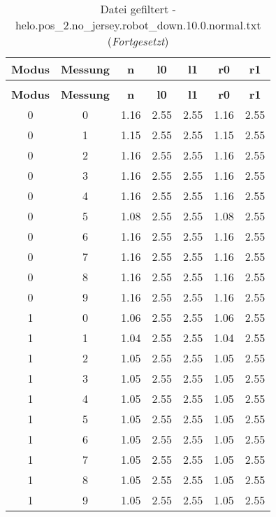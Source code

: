 \clearpage{}
\begin{longtable}{|c|c||c||c|c||c|c|}
	\caption{Datei gefiltert - helo.pos\_2.no\_jersey.robot\_down.10.0.normal.txt} \label{tab:helo.pos-2.no-jersey.robot-down.10.0.normal.txt} \\ \hline
	\textbf{Modus} & \textbf{Messung} & \textbf{n} & \textbf{l0} & \textbf{l1} & \textbf{r0} & \textbf{r1}\\ \hline
	\endfirsthead
	\caption[]{Datei gefiltert - helo.pos\_2.no\_jersey.robot\_down.10.0.normal.txt (\emph{Fortgesetzt})} \\ \hline
	\textbf{Modus} & \textbf{Messung} & \textbf{n} & \textbf{l0} & \textbf{l1} & \textbf{r0} & \textbf{r1}\\ \hline
	\endhead
	0 & 0 & 1.16 & 2.55 & 2.55 & 1.16 & 2.55 \\ \hline
	0 & 1 & 1.15 & 2.55 & 2.55 & 1.15 & 2.55 \\ \hline
	0 & 2 & 1.16 & 2.55 & 2.55 & 1.16 & 2.55 \\ \hline
	0 & 3 & 1.16 & 2.55 & 2.55 & 1.16 & 2.55 \\ \hline
	0 & 4 & 1.16 & 2.55 & 2.55 & 1.16 & 2.55 \\ \hline
	0 & 5 & 1.08 & 2.55 & 2.55 & 1.08 & 2.55 \\ \hline
	0 & 6 & 1.16 & 2.55 & 2.55 & 1.16 & 2.55 \\ \hline
	0 & 7 & 1.16 & 2.55 & 2.55 & 1.16 & 2.55 \\ \hline
	0 & 8 & 1.16 & 2.55 & 2.55 & 1.16 & 2.55 \\ \hline
	0 & 9 & 1.16 & 2.55 & 2.55 & 1.16 & 2.55 \\ \hline
	1 & 0 & 1.06 & 2.55 & 2.55 & 1.06 & 2.55 \\ \hline
	1 & 1 & 1.04 & 2.55 & 2.55 & 1.04 & 2.55 \\ \hline
	1 & 2 & 1.05 & 2.55 & 2.55 & 1.05 & 2.55 \\ \hline
	1 & 3 & 1.05 & 2.55 & 2.55 & 1.05 & 2.55 \\ \hline
	1 & 4 & 1.05 & 2.55 & 2.55 & 1.05 & 2.55 \\ \hline
	1 & 5 & 1.05 & 2.55 & 2.55 & 1.05 & 2.55 \\ \hline
	1 & 6 & 1.05 & 2.55 & 2.55 & 1.05 & 2.55 \\ \hline
	1 & 7 & 1.05 & 2.55 & 2.55 & 1.05 & 2.55 \\ \hline
	1 & 8 & 1.05 & 2.55 & 2.55 & 1.05 & 2.55 \\ \hline
	1 & 9 & 1.05 & 2.55 & 2.55 & 1.05 & 2.55 \\ \hline

\end{longtable}
